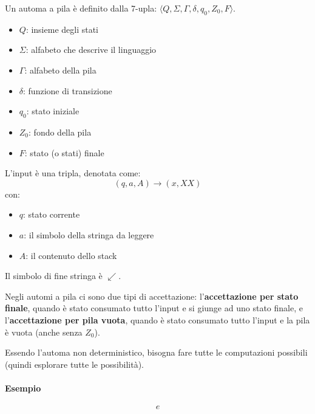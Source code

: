 \documentclass[11pt]{article}
\begin{document}
Un automa a pila è definito dalla 7-upla: $\langle Q,\Sigma,\Gamma,\delta,q_0,Z_0,F \rangle$.
\begin{itemize}
    \item $Q$: insieme degli stati
    \item $\Sigma$: alfabeto che descrive il linguaggio
    \item $\Gamma$: alfabeto della pila 
    \item $\delta$: funzione di transizione
    \item $q_0$: stato iniziale 
    \item $Z_0$: fondo della pila 
    \item $F$: stato (o stati) finale
\end{itemize}
L'input è una tripla, denotata come:
\begin{equation*}
    (q,a,A)\rightarrow(x,XX)
\end{equation*}
con:
\begin{itemize}
    \item $q$: stato corrente
    \item $a$: il simbolo della stringa da leggere
    \item $A$: il contenuto dello stack
\end{itemize}
Il simbolo di fine stringa è $\swarrow$.

Negli automi a pila ci sono due tipi di accettazione: l'\textbf{accettazione per stato finale}, quando è stato consumato 
tutto l'input e si giunge ad uno stato finale, e l'\textbf{accettazione per pila vuota}, quando è stato consumato tutto 
l'input e la pila è vuota (anche senza $Z_0$).

Essendo l'automa non deterministico, bisogna fare tutte le computazioni possibili (quindi esplorare tutte le possibilità).
\paragraph{Esempio}
\begin{equation*}
    e
\end{equation*}
\end{document}
